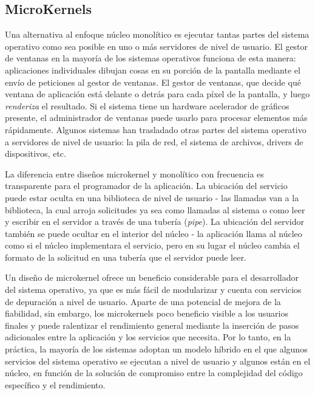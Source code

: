 \documentclass[10pt]{book}
\begin{document}
\subsection{MicroKernels}
Una alternativa al enfoque núcleo monolítico es ejecutar tantas partes del sistema operativo como sea posible en uno o más servidores de nivel de usuario. El gestor de ventanas en la mayoría de los sistemas operativos funciona de esta manera: aplicaciones individuales dibujan cosas en su porción de la pantalla mediante el envío de peticiones al gestor de ventanas. El gestor de ventanas, que decide qué ventana de aplicación está delante o detrás para cada píxel de la pantalla, y luego \textit{renderiza} el resultado. Si el sistema tiene un hardware acelerador de gráficos presente, el administrador de ventanas puede usarlo para procesar elementos más rápidamente. Algunos sistemas han trasladado otras partes del sistema operativo a servidores de nivel de usuario: la pila de red, el sistema de archivos, drivers de dispositivos, etc.

La diferencia entre diseños microkernel y monolítico con frecuencia es transparente para el programador de la aplicación. La ubicación del servicio puede estar oculta en una biblioteca de nivel de usuario - las llamadas van a la biblioteca, la cual arroja solicitudes ya sea como llamadas al sistema o como leer y escribir en el servidor a través de una tubería (\textit{pipe}). La ubicación del servidor también se puede ocultar en el interior del núcleo - la aplicación llama al núcleo como si el núcleo implementara el servicio, pero en su lugar el núcleo cambia el formato de la solicitud en una tubería que el servidor puede leer.

Un diseño de microkernel ofrece un beneficio considerable para el desarrollador del sistema operativo, ya que es más fácil de modularizar y cuenta con servicios de depuración a nivel de usuario. Aparte de una potencial de mejora de la fiabilidad, sin embargo, los microkernels poco beneficio visible a los usuarios finales y puede ralentizar el rendimiento general mediante la inserción de pasos adicionales entre la aplicación y los servicios que necesita. Por lo tanto, en la práctica, la mayoría de los sistemas adoptan un modelo híbrido en el que algunos servicios del sistema operativo se ejecutan a nivel de usuario y algunos están en el núcleo, en función de la solución de compromiso entre la complejidad del código específico y el rendimiento.
\end{document}
